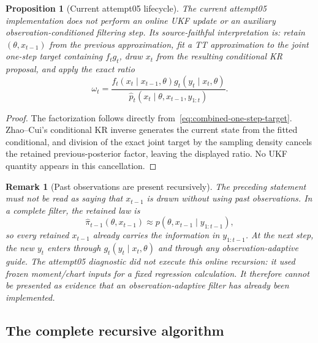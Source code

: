 \documentclass[11pt]{article}
\newtheorem{proposition}{Proposition}
\newtheorem{remark}{Remark}
\begin{document}
\begin{proposition}[Current attempt05 lifecycle]
\label{prop:current-lifecycle}
The current attempt05 implementation does not perform an online UKF update or
an auxiliary observation-conditioned filtering step. Its source-faithful
interpretation is: retain $(\theta,x_{t-1})$ from the previous approximation,
fit a TT approximation to the joint one-step target containing $f_tg_t$, draw
$x_t$ from the resulting conditional KR proposal, and apply the exact ratio
\[
 \omega_t=\frac{f_t(x_t\mid x_{t-1},\theta)
 g_t(y_t\mid x_t,\theta)}
 {\widehat p_t(x_t\mid\theta,x_{t-1},y_{1:t})}.
 \]
\end{proposition}
\begin{proof}
The factorization follows directly from~\eqref{eq:combined-one-step-target}.
Zhao--Cui's conditional KR inverse generates the current state from the fitted
conditional, and division of the exact joint target by the sampling density
cancels the retained previous-posterior factor, leaving the displayed ratio.
No UKF quantity appears in this cancellation.
\end{proof}

\begin{remark}[Past observations are present recursively]
The preceding statement must not be read as saying that $x_{t-1}$ is drawn
without using past observations. In a complete filter, the retained law is
\[
 \widehat\pi_{t-1}(\theta,x_{t-1})
 \approx p(\theta,x_{t-1}\mid y_{1:t-1}),
\]
so every retained $x_{t-1}$ already carries the information in
$y_{1:t-1}$. At the next step, the new $y_t$ enters through
$g_t(y_t\mid x_t,\theta)$ and through any observation-adaptive guide. The
attempt05 diagnostic did not execute this online recursion: it used frozen
moment/chart inputs for a fixed regression calculation. It therefore cannot
be presented as evidence that an observation-adaptive filter has already been
implemented.
\end{remark}

\subsection{The complete recursive algorithm}
\end{document}
